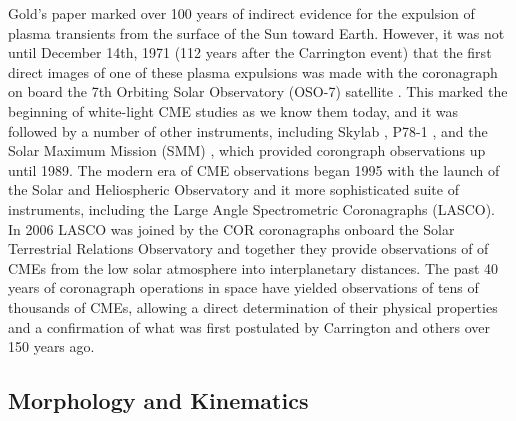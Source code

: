 Gold's paper marked over 100 years of indirect evidence for the expulsion of plasma transients from the surface of the Sun toward Earth. However, it was not until December 14th, 1971 (112 years after the Carrington event) that the first direct images of one of these plasma expulsions was made with the coronagraph on board the 7th Orbiting Solar Observatory (OSO-7) satellite \citep{tousey1971}. This marked the beginning of white-light CME studies as we know them today, and it was followed by a number of other instruments, including Skylab \citep{macqueen1980}, P78-1 \citep{sheeley1980}, and the Solar Maximum Mission (SMM) \citep{hundhausen1999}, which provided corongraph observations up until 1989. The modern era of CME observations began 1995 with the launch of the Solar and Heliospheric Observatory \citep[\emph{SOHO};][]{dom95} and it more sophisticated suite of instruments, including the Large Angle Spectrometric Coronagraphs (LASCO). In 2006 LASCO was joined by the COR coronagraphs onboard the Solar Terrestrial Relations Observatory \citep[\emph{STEREO};][]{kai08} and together they provide observations of of CMEs from the low solar atmosphere into interplanetary distances. The past 40 years of coronagraph operations in space have yielded observations of tens of thousands of CMEs, allowing a direct determination of their physical properties and a confirmation of what was first postulated by Carrington and others over 150 years ago.

\subsection{Morphology and Kinematics} 


